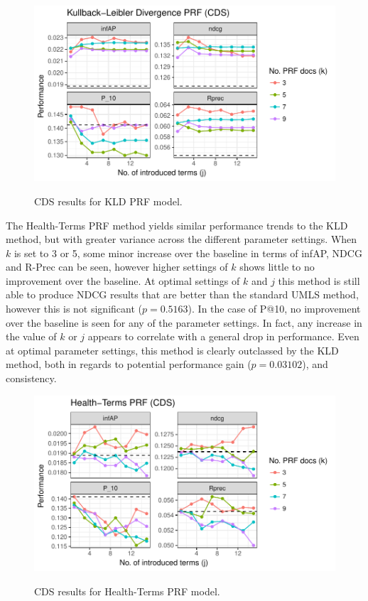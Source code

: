 \documentclass[a4paper]{report}
\begin{document}
\begin{figure}
\centering
\caption{CDS results for KLD PRF model.}
\includegraphics[width=.9\columnwidth]{cds-kldprf.pdf}
\label{cds_kldprf_results}
\end{figure}

The Health-Terms PRF method yields similar performance trends to the KLD method, but with greater variance across the different parameter settings. When $k$ is set to 3 or 5, some minor increase over the baseline in terms of infAP, NDCG and R-Prec can be seen, however higher settings of $k$ shows little to no improvement over the baseline. At optimal settings of $k$ and $j$ this method is still able to produce NDCG results that are better than the standard UMLS method, however this is not significant ($p=0.5163$). In the case of P@10, no improvement over the baseline is seen for any of the parameter settings. In fact, any increase in the value of $k$ or $j$ appears to correlate with a general drop in performance. Even at optimal parameter settings, this method is clearly outclassed by the KLD method, both in regards to potential performance gain ($p=0.03102$), and consistency. 

\begin{figure}
\centering
\caption{CDS results for Health-Terms PRF model.}
\includegraphics[width=.9\columnwidth]{cds-htprf.pdf}
\label{cds_htprf_results}
\end{figure}
\end{document}
